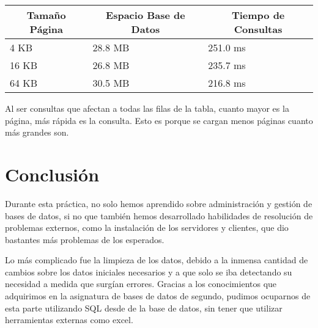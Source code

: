 \documentclass[a4paper, 11pt, oneside]{article} %
\begin{document}
\begin{table}[H]
\centering
\begin{tabular}{|l|l|l|}
\hline
\multicolumn{1}{|c|}{Tamaño Página} & \multicolumn{1}{c|}{Espacio Base de Datos} & \multicolumn{1}{c|}{Tiempo de Consultas} \\ \hline
4 KB                                & 28.8 MB                                    & 251.0 ms                                 \\ \hline
16 KB                               & 26.8 MB                                    & 235.7 ms                                 \\ \hline
64 KB                               & 30.5 MB                                    & 216.8 ms                                 \\ \hline
\end{tabular}
\end{table}

Al ser consultas que afectan a todas las filas de la tabla, cuanto mayor es la página, más rápida es la consulta. Esto es porque se cargan menos páginas cuanto más grandes son.

\newpage


\section{Conclusión}

Durante esta práctica, no solo hemos aprendido sobre administración y gestión de bases de datos, si no que también hemos desarrollado habilidades de resolución de problemas externos, como la instalación de los servidores y clientes, que dio bastantes más problemas de los esperados.

Lo más complicado fue la limpieza de los datos, debido a la inmensa cantidad de cambios sobre los datos iniciales necesarios y a que solo se iba detectando su necesidad a medida que surgían errores. Gracias a los conocimientos que adquirimos en la asignatura de bases de datos de segundo, pudimos ocuparnos de esta parte utilizando SQL desde de la base de datos, sin tener que utilizar herramientas externas como excel.
\end{document}
